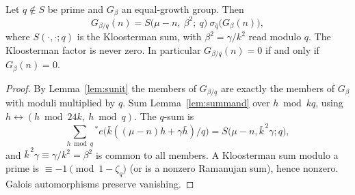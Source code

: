 \documentclass[11pt]{amsart}
\theoremstyle{definition}\newtheorem{definition}[theorem]{Definition}
\theoremstyle{remark}\newtheorem{remark}[theorem]{Remark}
\begin{document}
\begin{proposition}\label{prop:scaling}
Let $q\notin S$ be prime and $G_\beta$ an equal-growth group. Then
\[
G_{\beta/q}(n)=S\big(\mu-n,\ \beta^2;\ q\big)\ \sigma_{\bar q}\big(G_\beta(n)\big),
\]
where $S(\cdot,\cdot;q)$ is the Kloosterman sum, with $\beta^2=\gamma/k^2$ read modulo $q$. The Kloosterman factor is never zero. In particular $G_{\beta/q}(n)=0$ if and only if $G_\beta(n)=0$.
\end{proposition}
\begin{proof}
By Lemma~\ref{lem:sunit} the members of $G_{\beta/q}$ are exactly the members of $G_\beta$ with moduli multiplied by $q$. Sum Lemma~\ref{lem:summand} over $h\bmod kq$, using $h\leftrightarrow(h\bmod 24k,\ h\bmod q)$. The $q$-sum is
\[
\sum_{h\bmod q}{}^{*}e\big(\bar k((\mu-n)h+\gamma\bar h)/q\big)=S\big(\mu-n,\bar k^{\,2}\gamma;q\big),
\]
and $\bar k^{\,2}\gamma\equiv\gamma/k^2=\beta^2$ is common to all members. A Kloosterman sum modulo a prime is $\equiv-1\pmod{1-\zeta_q}$ (or is a nonzero Ramanujan sum), hence nonzero. Galois automorphisms preserve vanishing.
\end{proof}
\end{document}
